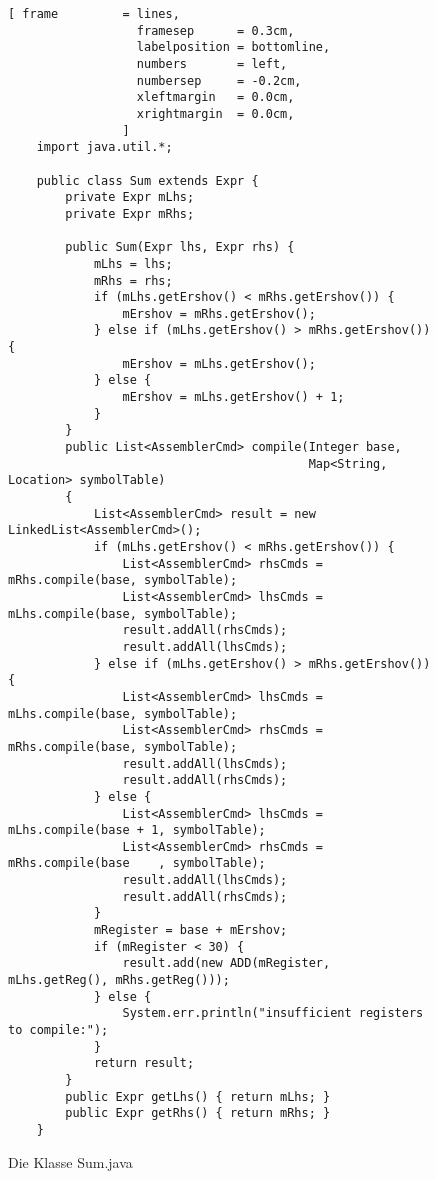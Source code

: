 \begin{figure}[!ht]
\centering
\begin{Verbatim}[ frame         = lines, 
                  framesep      = 0.3cm, 
                  labelposition = bottomline,
                  numbers       = left,
                  numbersep     = -0.2cm,
                  xleftmargin   = 0.0cm,
                  xrightmargin  = 0.0cm,
                ]
    import java.util.*;
    
    public class Sum extends Expr {
        private Expr mLhs;
        private Expr mRhs;
    
        public Sum(Expr lhs, Expr rhs) {
            mLhs = lhs;
            mRhs = rhs;
            if (mLhs.getErshov() < mRhs.getErshov()) {
                mErshov = mRhs.getErshov();
            } else if (mLhs.getErshov() > mRhs.getErshov()) {
                mErshov = mLhs.getErshov();
            } else {
                mErshov = mLhs.getErshov() + 1;
            }
        }
        public List<AssemblerCmd> compile(Integer base, 
                                          Map<String, Location> symbolTable) 
        {
            List<AssemblerCmd> result = new LinkedList<AssemblerCmd>();
            if (mLhs.getErshov() < mRhs.getErshov()) {
                List<AssemblerCmd> rhsCmds = mRhs.compile(base, symbolTable);
                List<AssemblerCmd> lhsCmds = mLhs.compile(base, symbolTable);
                result.addAll(rhsCmds);
                result.addAll(lhsCmds);
            } else if (mLhs.getErshov() > mRhs.getErshov()) {
                List<AssemblerCmd> lhsCmds = mLhs.compile(base, symbolTable);
                List<AssemblerCmd> rhsCmds = mRhs.compile(base, symbolTable);
                result.addAll(lhsCmds);
                result.addAll(rhsCmds);
            } else {
                List<AssemblerCmd> lhsCmds = mLhs.compile(base + 1, symbolTable);
                List<AssemblerCmd> rhsCmds = mRhs.compile(base    , symbolTable);
                result.addAll(lhsCmds);
                result.addAll(rhsCmds);
            }
            mRegister = base + mErshov;
            if (mRegister < 30) {
                result.add(new ADD(mRegister, mLhs.getReg(), mRhs.getReg()));
            } else {
                System.err.println("insufficient registers to compile:");
            }
            return result;
        }
        public Expr getLhs() { return mLhs; }
        public Expr getRhs() { return mRhs; }
    }
\end{Verbatim}
\vspace*{-0.3cm}
\caption{Die Klasse Sum.java}
\label{fig:Sum.java-SRP}
\end{figure}

